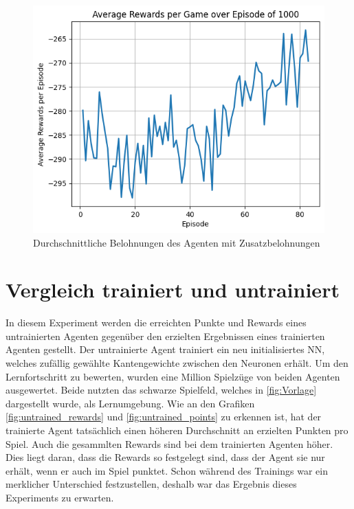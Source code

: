 \begin{figure}[!h]
    \centering
    \includegraphics[scale=0.6]{Bilder/average_rewards.png}
    \caption{Durchschnittliche Belohnungen des Agenten mit Zusatzbelohnungen }
    \label{fig:average_rewards}
\end{figure}
\clearpage

\section{Vergleich trainiert und untrainiert}
In diesem Experiment werden die erreichten Punkte und Rewards eines untrainierten Agenten gegenüber den erzielten Ergebnissen eines trainierten Agenten gestellt. Der untrainierte Agent trainiert ein neu initialisiertes NN, welches zufällig gewählte Kantengewichte zwischen den Neuronen erhält. Um den Lernfortschritt zu bewerten, wurden eine Million Spielzüge von beiden Agenten ausgewertet. Beide nutzten das schwarze Spielfeld, welches in \ref{fig:Vorlage} dargestellt wurde, als Lernumgebung. 
Wie an den Grafiken \ref{fig:untrained_rewards} und \ref{fig:untrained_points} zu erkennen ist, hat der trainierte Agent tatsächlich einen höheren Durchschnitt an erzielten Punkten pro Spiel. Auch die gesammlten Rewards sind bei dem trainierten Agenten höher.
Dies liegt daran, dass die Rewards so festgelegt sind, dass der Agent sie nur erhält, wenn er auch im Spiel punktet.
Schon während des Trainings war ein merklicher Unterschied festzustellen, deshalb war das Ergebnis dieses Experiments zu erwarten.


